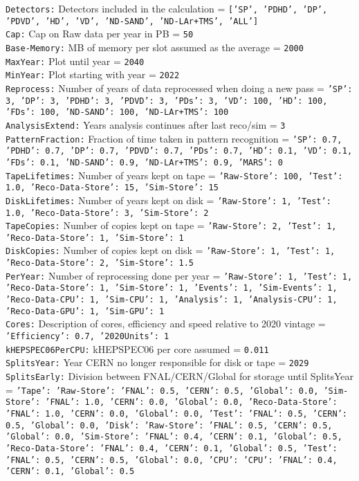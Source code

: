 {\tt Detectors:} Detectors included in the calculation = {\tt ['SP', 'PDHD', 'DP', 'PDVD', 'HD', 'VD', 'ND-SAND', 'ND-LAr+TMS', 'ALL']} \\
{\tt Cap:} Cap on Raw data per year in PB = {\tt 50} \\
{\tt Base-Memory:} MB of memory per slot assumed as the average = {\tt 2000} \\
{\tt MaxYear:} Plot until year = {\tt 2040} \\
{\tt MinYear:} Plot starting with year = {\tt 2022} \\
{\tt Reprocess:} Number of years of data reprocessed when doing a new pass = {\tt {'SP': 3, 'DP': 3, 'PDHD': 3, 'PDVD': 3, 'PDs': 3, 'VD': 100, 'HD': 100, 'FDs': 100, 'ND-SAND': 100, 'ND-LAr+TMS': 100}} \\
{\tt AnalysisExtend:} Years analysis continues after last reco/sim = {\tt 3} \\
{\tt PatternFraction:} Fraction of time taken in pattern recognition = {\tt {'SP': 0.7, 'PDHD': 0.7, 'DP': 0.7, 'PDVD': 0.7, 'PDs': 0.7, 'HD': 0.1, 'VD': 0.1, 'FDs': 0.1, 'ND-SAND': 0.9, 'ND-LAr+TMS': 0.9, 'MARS': 0}} \\
{\tt TapeLifetimes:} Number of years kept on tape = {\tt {'Raw-Store': 100, 'Test': 1.0, 'Reco-Data-Store': 15, 'Sim-Store': 15}} \\
{\tt DiskLifetimes:} Number of years kept on disk = {\tt {'Raw-Store': 1, 'Test': 1.0, 'Reco-Data-Store': 3, 'Sim-Store': 2}} \\
{\tt TapeCopies:} Number of copies kept on tape = {\tt {'Raw-Store': 2, 'Test': 1, 'Reco-Data-Store': 1, 'Sim-Store': 1}} \\
{\tt DiskCopies:} Number of copies kept on disk = {\tt {'Raw-Store': 1, 'Test': 1, 'Reco-Data-Store': 2, 'Sim-Store': 1.5}} \\
{\tt PerYear:} Number of reprocessing done per year = {\tt {'Raw-Store': 1, 'Test': 1, 'Reco-Data-Store': 1, 'Sim-Store': 1, 'Events': 1, 'Sim-Events': 1, 'Reco-Data-CPU': 1, 'Sim-CPU': 1, 'Analysis': 1, 'Analysis-CPU': 1, 'Reco-Data-GPU': 1, 'Sim-GPU': 1}} \\
{\tt Cores:} Description of cores, efficiency and speed relative to 2020 vintage = {\tt {'Efficiency': 0.7, '2020Units': 1}} \\
{\tt kHEPSPEC06PerCPU:} kHEPSPEC06 per core assumed = {\tt 0.011} \\
{\tt SplitsYear:} Year CERN no longer responsible for disk or tape = {\tt 2029} \\
{\tt SplitsEarly:} Division between FNAL/CERN/Global for storage until SplitsYear = {\tt {'Tape': {'Raw-Store': {'FNAL': 0.5, 'CERN': 0.5, 'Global': 0.0}, 'Sim-Store': {'FNAL': 1.0, 'CERN': 0.0, 'Global': 0.0}, 'Reco-Data-Store': {'FNAL': 1.0, 'CERN': 0.0, 'Global': 0.0}, 'Test': {'FNAL': 0.5, 'CERN': 0.5, 'Global': 0.0}}, 'Disk': {'Raw-Store': {'FNAL': 0.5, 'CERN': 0.5, 'Global': 0.0}, 'Sim-Store': {'FNAL': 0.4, 'CERN': 0.1, 'Global': 0.5}, 'Reco-Data-Store': {'FNAL': 0.4, 'CERN': 0.1, 'Global': 0.5}, 'Test': {'FNAL': 0.5, 'CERN': 0.5, 'Global': 0.0}}, 'CPU': {'CPU': {'FNAL': 0.4, 'CERN': 0.1, 'Global': 0.5}}}} \\
